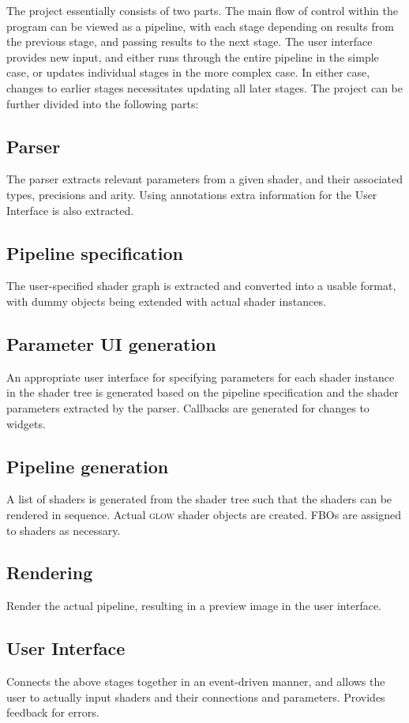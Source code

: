\documentclass[12pt,twoside,notitlepage]{report}
\begin{document}
The project essentially consists of two parts. The main flow of control within the program can be viewed as a pipeline, with each stage depending on results from the previous stage, and passing results to the next stage. The user interface provides new input, and either runs through the entire pipeline in the simple case, or updates individual stages in the more complex case. In either case, changes to earlier stages necessitates updating all later stages. The project can be further divided into the following parts:
\subsection*{Parser}
The parser extracts relevant parameters from a given shader, and their associated types, precisions and arity. Using annotations extra information for the User Interface is also extracted.
\subsection*{Pipeline specification}
The user-specified shader graph is extracted and converted into a usable format, with dummy objects being extended with actual shader instances.
\subsection*{Parameter UI generation}
An appropriate user interface for specifying parameters for each shader instance in the shader tree is generated based on the pipeline specification and the shader parameters extracted by the parser. Callbacks are generated for changes to widgets.
\subsection*{Pipeline generation}
A list of shaders is generated from the shader tree such that the shaders can be rendered in sequence. Actual \textsc{glow} shader objects are created. FBOs are assigned to shaders as necessary.
\subsection*{Rendering}
Render the actual pipeline, resulting in a preview image in the user interface.
\subsection*{User Interface}
Connects the above stages together in an event-driven manner, and allows the user to actually input shaders and their connections and parameters. Provides feedback for errors.
\end{document}
